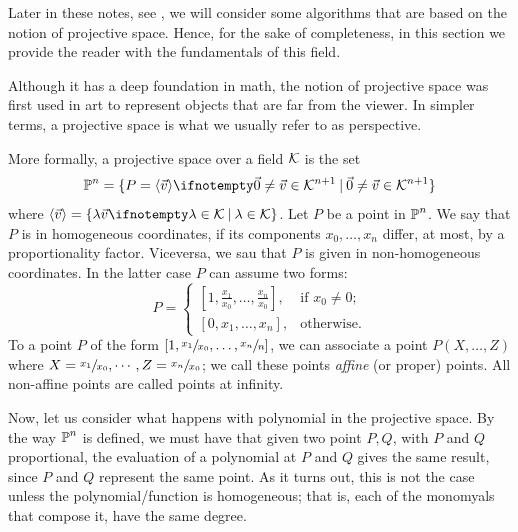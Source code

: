 \documentclass{subfiles}
\begin{document}
    Later in these notes, see ,
        we will consider some algorithms that are based on the notion of projective space.
        Hence, for the sake of completeness, 
        in this section we provide the reader with the fundamentals of this field.

    Although it has a deep foundation in math,
        the notion of projective space was first used in art to represent objects that are far from the viewer.
        In simpler terms, a projective space is what we usually refer to as perspective.

    More formally, a projective space over a field $\mathcal{K}$ is the set 
        $$
            \ps^{n} = \set[\vec{0} \ne \vec{v} \in \K^{n + 1}]{P = \gen{\vec{v}}} 
        $$
        where $\gen{\vec{v}} = \set[\lambda \in \K]{\lambda \vec{v}}$.
        Let $P$ be a point in $\operatorname{\mathbb{P}}^{n}$.
        We say that $P$ is in homogeneous coordinates, if its components $x_{0}, \ldots, x_{n}$ differ,
        at most, by a proportionality factor. Viceversa, we sau that $P$ is given in non-homogeneous coordinates.
        In the latter case $P$ can assume two forms:
        $$
            P = \begin{cases}
                [1, \frac{x_{1}}{x_{0}}, \ldots, \frac{x_{n}}{x_{0}}], & \text{if } x_{0} \ne 0; \\ 
                [0, x_{1}, \ldots, x_{n}], & \text{otherwise}.
            \end{cases}
        $$
        To a point $P$ of the form $[1, \sfrac{x_{1}}{x_{0}}, \ldots, \sfrac{x_{n}}{n}]$,
        we can associate a point $P(X, \ldots, Z)$ where $X = \sfrac{x_{1}}{x_{0}}, \cdots, Z = \sfrac{x_{n}}{x_{0}}$;
        we call these points \emph{affine} (or proper) points. All non-affine points are called points at infinity. 

    Now, let us consider what happens with polynomial in the projective space.
        By the way $\operatorname{\mathbb{P}}^{n}$ is defined, we must have that given two point $P, Q$,
        with $P$ and $Q$ proportional, the evaluation of a polynomial at $P$ and $Q$ gives the same
        result, since $P$ and $Q$ represent the same point.
        As it turns out, this is not the case unless the polynomial/function is homogeneous;
        that is, each of the monomyals that compose it, have the same degree.


        
\end{document}
